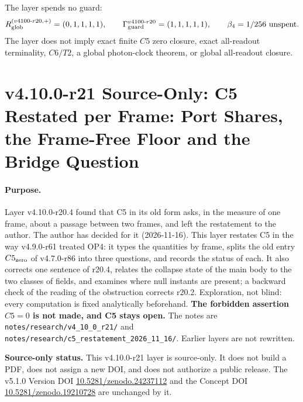 The layer spends no guard:
\[
R_{\rm glob}^{(v4100\text{-}r20,+)}=(0,1,1,1,1),
\qquad
\Gamma_{\rm guard}^{v4100\text{-}r20}=(1,1,1,1,1),
\qquad
\beta_4=1/256\ \text{unspent}.
\]
The layer does not imply exact finite \(C5\) zero closure, exact all-readout terminality, \(C6/T2\), a global photon-clock theorem,
or global all-readout closure.

\clearpage
\section*{v4.10.0-r21 Source-Only: C5 Restated per Frame: Port Shares, the Frame-Free Floor and the Bridge Question}
\label{sec:v4100-r21-c5-restated}

\paragraph{Purpose.}
Layer v4.10.0-r20.4 found that C5 in its old form asks, in the measure of one frame, about a passage between two frames, and left the
restatement to the author.  The author has decided for it (2026-11-16).  This layer restates C5 in the way v4.9.0-r61 treated OP4: it
types the quantities by frame, splits the old entry \(C5_{\rm zero}\) of v4.7.0-r86 into three questions, and records the status of
each.  It also corrects one sentence of r20.4, relates the collapse state of the main body to the two classes of fields, and
examines where null instants are present; a backward check of the reading of the obstruction
corrects r20.2.  Exploration, not blind: every computation is fixed analytically beforehand.
\textbf{The forbidden assertion \(C5=0\) is not made, and C5 stays open.}  The notes are
\texttt{notes/\allowbreak research/\allowbreak v4\_10\_0\_r21/} and
\texttt{notes/\allowbreak research/\allowbreak c5\_restatement\_2026\_11\_16/}.  Earlier layers are not rewritten.

\noindent\textbf{Source-only status.}
This v4.10.0-r21 layer is source-only.  It does not build a PDF, does not assign a new DOI,
and does not authorize a public release.  The v5.1.0 Version DOI
\href{https://doi.org/10.5281/zenodo.24237112}{10.5281/zenodo.24237112} and the Concept DOI
\href{https://doi.org/10.5281/zenodo.19210728}{10.5281/zenodo.19210728} are unchanged by it.

